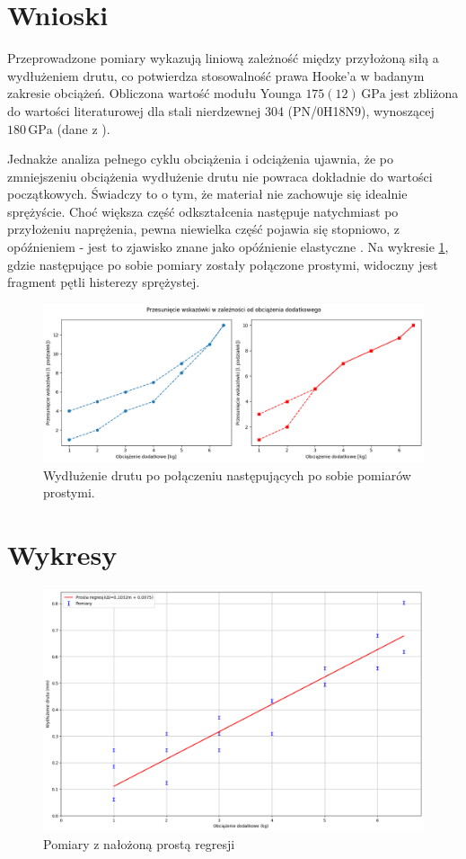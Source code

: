 \documentclass[a4paper,12pt]{article}
\begin{document}
\section{Wnioski}

Przeprowadzone pomiary wykazują liniową zależność między przyłożoną siłą a wydłużeniem drutu, co potwierdza stosowalność prawa Hooke'a w badanym zakresie obciążeń. Obliczona wartość modułu Younga \( 175(12)\,\text{GPa} \) jest zbliżona do wartości literaturowej dla stali nierdzewnej 304 (PN/0H18N9), wynoszącej \( 180\,\text{GPa} \) (dane z \cite{calculla}).

Jednakże analiza pełnego cyklu obciążenia i odciążenia ujawnia, że po zmniejszeniu obciążenia wydłużenie drutu nie powraca dokładnie do wartości początkowych. Świadczy to o tym, że materiał nie zachowuje się idealnie sprężyście. Choć większa część odkształcenia następuje natychmiast po przyłożeniu naprężenia, pewna niewielka część pojawia się stopniowo, z opóźnieniem - jest to zjawisko znane jako opóźnienie elastyczne \cite{Drynski1976}. Na wykresie \ref{fig:histereza}, gdzie następujące po sobie pomiary zostały połączone prostymi, widoczny jest fragment pętli histerezy sprężystej.

\begin{figure}[H]
    \centering
    \includegraphics[width=1\linewidth]{histereza.png}
    \caption{Wydłużenie drutu po połączeniu następujących po sobie pomiarów prostymi.}
    \label{fig:histereza}
\end{figure}

\section{Wykresy}

\begin{figure}[H]
    \centering
    \includegraphics[width=1.2\linewidth,angle=90]{prosta_regresji.png}
    \caption{Pomiary z nałożoną prostą regresji}
    \label{fig:prosta_regresji}
\end{figure}


\newpage


\end{document}
